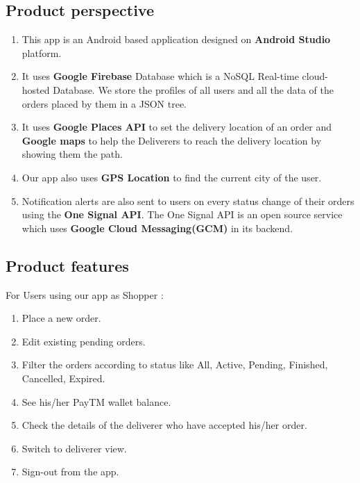 \documentclass{report}
\begin{document}
\subsection{Product perspective}

\begin{enumerate}[label=\alph*)]
\item This app is an Android based application designed on \textbf{Android Studio} platform.
\item It uses \textbf{Google Firebase} Database which is a NoSQL Real-time cloud-hosted Database. We store the profiles of all users and all the data of the orders placed by them in a JSON tree. 
\item It uses \textbf{Google Places API} to set the delivery location of an order and \textbf{Google maps} to help the Deliverers to reach the delivery location by showing them the path. 
\item Our app also uses \textbf{GPS Location} to find the current city of the user. 
\item Notification alerts are also sent to users on every status change of their orders using the \textbf{One Signal API}. The One Signal API  is an open source service which uses \textbf{Google Cloud Messaging(GCM)} in its backend.
\end{enumerate}

\subsection{Product features}

For Users using our app as Shopper :
\begin{enumerate}[label=\alph*)]
\item Place a new order.
\item Edit existing pending orders.
\item Filter the orders according to status like All, Active, Pending, Finished, Cancelled, Expired.
\item See his/her PayTM wallet balance.
\item Check the details of the deliverer who have accepted his/her order.
\item Switch to deliverer view.
\item Sign-out from the app.
\end{enumerate}
\end{document}
